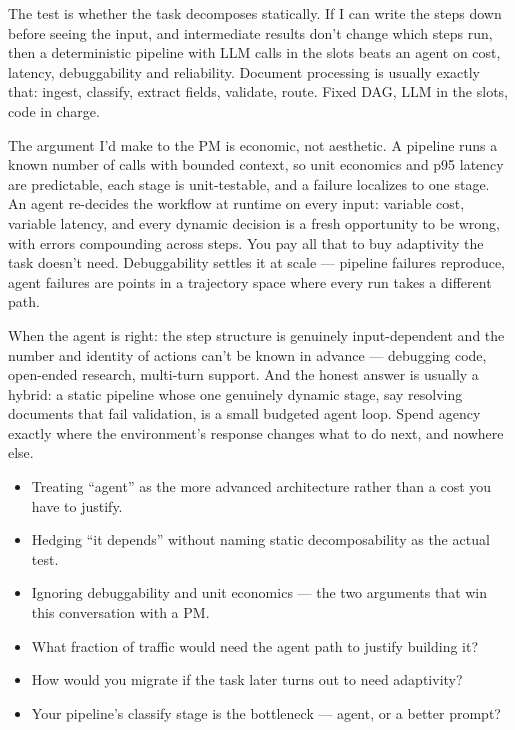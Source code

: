 \documentclass[10pt,twoside]{book}
\newcommand{\lab}[1]{\par\vspace{5pt}\noindent{\sffamily\footnotesize\bfseries\color{accent}#1}\par\vspace{1pt}}
\newcommand{\flab}[1]{\par\vspace{5pt}\noindent{\sffamily\footnotesize\bfseries\color{flag}#1}\par\vspace{1pt}}
\begin{document}
\lab{Say this}
The test is whether the task decomposes statically. If I can write the steps down before seeing the input, and intermediate results don't change which steps run, then a deterministic pipeline with LLM calls in the slots beats an agent on cost, latency, debuggability and reliability. Document processing is usually exactly that: ingest, classify, extract fields, validate, route. Fixed DAG, LLM in the slots, code in charge.\par\vspace{3pt}
The argument I'd make to the PM is economic, not aesthetic. A pipeline runs a known number of calls with bounded context, so unit economics and p95 latency are predictable, each stage is unit-testable, and a failure localizes to one stage. An agent re-decides the workflow at runtime on every input: variable cost, variable latency, and every dynamic decision is a fresh opportunity to be wrong, with errors compounding across steps. You pay all that to buy adaptivity the task doesn't need. Debuggability settles it at scale --- pipeline failures reproduce, agent failures are points in a trajectory space where every run takes a different path.\par\vspace{3pt}
When the agent is right: the step structure is genuinely input-dependent and the number and identity of actions can't be known in advance --- debugging code, open-ended research, multi-turn support. And the honest answer is usually a hybrid: a static pipeline whose one genuinely dynamic stage, say resolving documents that fail validation, is a small budgeted agent loop. Spend agency exactly where the environment's response changes what to do next, and nowhere else.\par\vspace{3pt}
\flab{Loses the signal}
\begin{itemize}
\item Treating ``agent'' as the more advanced architecture rather than a cost you have to justify.
\item Hedging ``it depends'' without naming static decomposability as the actual test.
\item Ignoring debuggability and unit economics --- the two arguments that win this conversation with a PM.
\end{itemize}
\lab{Then they ask}
\begin{itemize}
\item What fraction of traffic would need the agent path to justify building it?
\item How would you migrate if the task later turns out to need adaptivity?
\item Your pipeline's classify stage is the bottleneck --- agent, or a better prompt?
\end{itemize}
\end{document}

